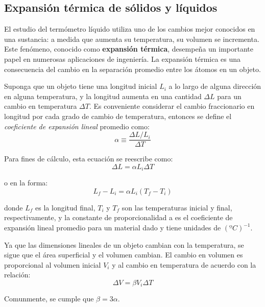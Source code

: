 \subsection{Expansión térmica de sólidos y líquidos}

  \PN El estudio del termómetro líquido utiliza uno de los cambios mejor conocidos en una sustancia: a medida que
  aumenta su temperatura, su volumen se incrementa. Este fenómeno, conocido como \textbf{expansión térmica}, desempeña
  un importante papel en numerosas aplicaciones de ingeniería. La expansión térmica es una consecuencia del cambio en la
  separación promedio entre los átomos en un objeto.

  \PN Suponga que un objeto tiene una longitud inicial $L_{i}$ a lo largo de alguna dirección en alguna temperatura, y
  la longitud aumenta en una cantidad $\Delta L$ para un cambio en temperatura $\Delta T$. Es conveniente considerar el
  cambio fraccionario en longitud por cada grado de cambio de temperatura, entonces se define el \textit{coeficiente de
  expansión lineal} promedio como:
  \begin{equation*}
    \alpha \equiv \frac{\Delta L / L_{i}}{\Delta T}
  \end{equation*}

  \PN Para fines de cálculo, esta ecuación se reescribe como:
  \begin{equation*}
    \Delta L = \alpha L_{i} \Delta T
  \end{equation*}

  \PN o en la forma:
  \begin{equation*}
    L_{f} - L_{i} = \alpha L_{i} \left(T_{f} - T_{i}\right)
  \end{equation*}

  \PN donde $L_{f}$ es la longitud final, $T_{i}$ y $T_{f}$ son las temperaturas inicial y final, respectivamente, y la
  constante de proporcionalidad a es el coeficiente de expansión lineal promedio para un material dado y tiene unidades
  de $(ºC)^{-1}$.

  \PN Ya que las dimensiones lineales de un objeto cambian con la temperatura, se sigue que el área superficial y el
  volumen cambian. El cambio en volumen es proporcional al volumen inicial $V_{i}$ y al cambio en temperatura de acuerdo
  con la relación:
  \begin{equation*}
    \Delta V = \beta V_{i} \Delta T
  \end{equation*}

  \PN Comunmente, se cumple que $\beta = 3 \alpha$.
